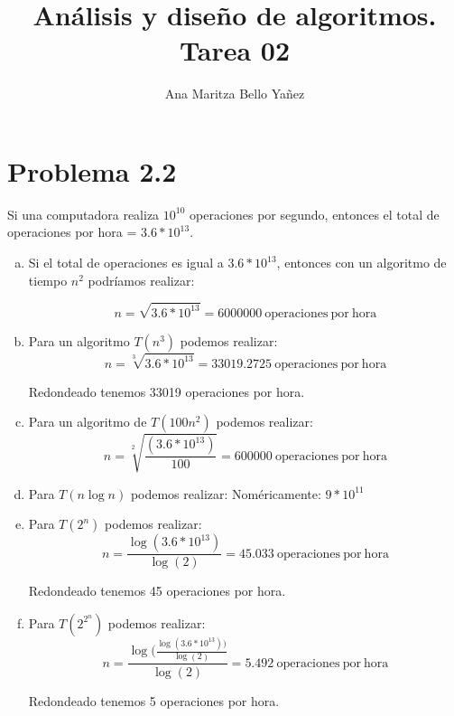 \documentclass{article}
\begin{document}
\title{Análisis y diseño de algoritmos. \\ Tarea 02}
\author{Ana Maritza Bello Yañez}
\maketitle

\section*{Problema 2.2}

Si una computadora realiza $ 10^{10} $ operaciones por segundo, entonces el
total de operaciones por hora = $3.6 * 10^{13} $.

\begin{enumerate}[(a)]
\item Si el total de operaciones es igual a $3.6 * 10^{13} $, entonces con un
algoritmo de tiempo $n^2$ podríamos realizar:

    \begin{equation}
        n = \sqrt{3.6 * 10^{13}} = 6000000 \mathrm{\ operaciones\ por\ hora}
    \end{equation}

\item Para un algoritmo $T(n^3)$ podemos realizar:
    \begin{equation}
        n = \sqrt[3]{3.6 * 10^{13}} = 33019.2725 \mathrm{\ operaciones\ por\ hora}
    \end{equation}

    Redondeado tenemos 33019 operaciones por hora.

\item Para un algoritmo de $T(100 n^2)$ podemos realizar:
    \begin{equation}
        n = \sqrt[2]{\frac{(3.6 * 10^{13})}{100}} = 600000 \mathrm{\ operaciones\ por\ hora}
    \end{equation}

\item Para $T(n \log{n})$ podemos realizar:
    Noméricamente: $9*10^{11}$

\item Para $T(2^n)$ podemos realizar:
    \begin{equation}
        n = \frac{\log(3.6 * 10^{13})}{\log(2)} = 45.033 \mathrm{\ operaciones\ por\ hora}
    \end{equation}

    Redondeado tenemos 45 operaciones por hora.

\item Para $T(2^{2^n})$ podemos realizar:
    \begin{equation}
        n = \frac{\log(\frac{\log(3.6 * 10^{13}))}{\log(2)}}{\log(2)} = 5.492 \mathrm{\ operaciones\ por\ hora}
    \end{equation}

    Redondeado tenemos 5 operaciones por hora.    

\end{enumerate}
\end{document}
